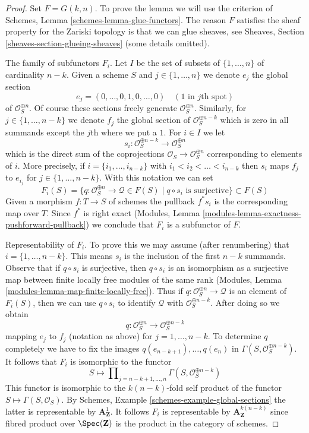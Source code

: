 \begin{proof}
Set $F = G(k, n)$. To prove the lemma we will use the criterion of
Schemes, Lemma \ref{schemes-lemma-glue-functors}.
The reason $F$ satisfies the sheaf property for the
Zariski topology is that we can glue sheaves, see Sheaves,
Section \ref{sheaves-section-glueing-sheaves} (some details omitted).

\medskip\noindent
The family of subfunctors $F_i$.
Let $I$ be the set of subsets of $\{1, \ldots, n\}$ of cardinality $n - k$.
Given a scheme $S$ and $j \in \{1, \ldots, n\}$ we denote $e_j$
the global section
$$
e_j = (0, \ldots, 0, 1, 0, \ldots, 0)\quad(1\text{ in }j\text{th spot})
$$
of $\mathcal{O}_S^{\oplus n}$. Of course these sections freely generate
$\mathcal{O}_S^{\oplus n}$. Similarly, for $j \in \{1, \ldots, n - k\}$
we denote $f_j$ the global section of $\mathcal{O}_S^{\oplus n - k}$
which is zero in all summands except the $j$th where we put a $1$.
For $i \in I$ we let
$$
s_i : \mathcal{O}_S^{\oplus n - k} \longrightarrow \mathcal{O}_S^{\oplus n}
$$
which is the direct sum of the coprojections
$\mathcal{O}_S \to \mathcal{O}_S^{\oplus n}$ corresponding to elements of $i$.
More precisely, if $i = \{i_1, \ldots, i_{n - k}\}$ with
$i_1 < i_2 < \ldots < i_{n - k}$
then $s_i$ maps $f_j$ to $e_{i_j}$ for $j \in \{1, \ldots, n - k\}$.
With this notation we can set
$$
F_i(S) = \{q : \mathcal{O}_S^{\oplus n} \to \mathcal{Q} \in F(S) \mid
q \circ s_i \text{ is surjective}\}
\subset F(S)
$$
Given a morphism $f : T \to S$ of schemes the pullback $f^*s_i$
is the corresponding map over $T$. Since $f^*$ is right exact
(Modules, Lemma \ref{modules-lemma-exactness-pushforward-pullback})
we conclude that $F_i$ is a subfunctor of $F$.

\medskip\noindent
Representability of $F_i$. To prove this we may assume (after renumbering)
that $i = \{1, \ldots, n - k\}$. This means $s_i$ is the inclusion of
the first $n - k$ summands. Observe that if $q \circ s_i$ is surjective,
then $q \circ s_i$ is an isomorphism as a surjective map between finite
locally free modules of the same rank
(Modules, Lemma \ref{modules-lemma-map-finite-locally-free}).
Thus if $q : \mathcal{O}_S^{\oplus n} \to \mathcal{Q}$ is an element of
$F_i(S)$, then we can use $q \circ s_i$ to identify $\mathcal{Q}$ with
$\mathcal{O}_S^{\oplus n - k}$. After doing so we obtain
$$
q : \mathcal{O}_S^{\oplus n} \longrightarrow \mathcal{O}_S^{\oplus n - k}
$$
mapping $e_j$ to $f_j$ (notation as above) for $j = 1, \ldots, n - k$.
To determine $q$ completely we have to fix the images
$q(e_{n - k + 1}), \ldots, q(e_n)$ in
$\Gamma(S, \mathcal{O}_S^{\oplus n - k})$.
It follows that $F_i$ is isomorphic to the functor
$$
S \longmapsto
\prod\nolimits_{j = n - k + 1, \ldots, n}
\Gamma(S,  \mathcal{O}_S^{\oplus n - k})
$$
This functor is isomorphic to the $k(n - k)$-fold self product of the functor
$S \mapsto \Gamma(S, \mathcal{O}_S)$. By
Schemes, Example \ref{schemes-example-global-sections}
the latter is representable by $\mathbf{A}^1_\mathbf{Z}$. It follows $F_i$
is representable by $\mathbf{A}^{k(n - k)}_\mathbf{Z}$ since fibred product
over $\Spec(\mathbf{Z})$ is the product in the category of schemes.


\end{proof}
